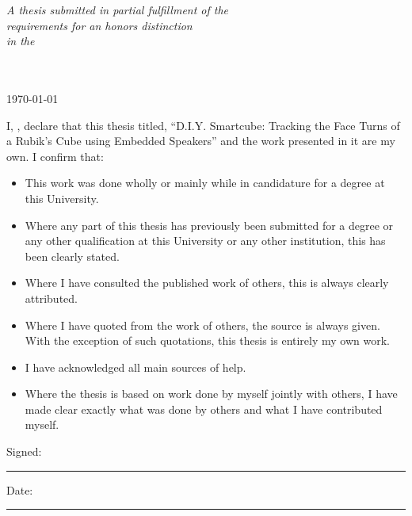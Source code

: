 \documentclass[
11pt, %
english, %
singlespacing, %
parskip, %
headsepline, %
]{MastersDoctoralThesis} %
\begin{document}
\begin{titlepage}
\begin{center}
\large \textit{A thesis submitted in partial fulfillment of the \\ requirements for an honors distinction}\\[0.3cm] %
\textit{in the}\\[0.4cm]
\groupname\\\deptname\\[2cm] %
 
\vfill

{\large \today}\\[4cm] %
 
\vfill
\end{center}
\end{titlepage}


\begin{declaration}
\addchaptertocentry{\authorshipname} %
\noindent I, \authorname, declare that this thesis titled, \enquote{D.I.Y. Smartcube: Tracking the Face Turns of a Rubik's Cube using Embedded Speakers} and the work presented in it are my own. I confirm that:

\begin{itemize} 
\item This work was done wholly or mainly while in candidature for a degree at this University.
\item Where any part of this thesis has previously been submitted for a degree or any other qualification at this University or any other institution, this has been clearly stated.
\item Where I have consulted the published work of others, this is always clearly attributed.
\item Where I have quoted from the work of others, the source is always given. With the exception of such quotations, this thesis is entirely my own work.
\item I have acknowledged all main sources of help.
\item Where the thesis is based on work done by myself jointly with others, I have made clear exactly what was done by others and what I have contributed myself.\\
\end{itemize}
 
\noindent Signed:\\
\rule[0.5em]{25em}{0.5pt} %
 
\noindent Date:\\
\rule[0.5em]{25em}{0.5pt} %
\end{declaration}
\end{document}
